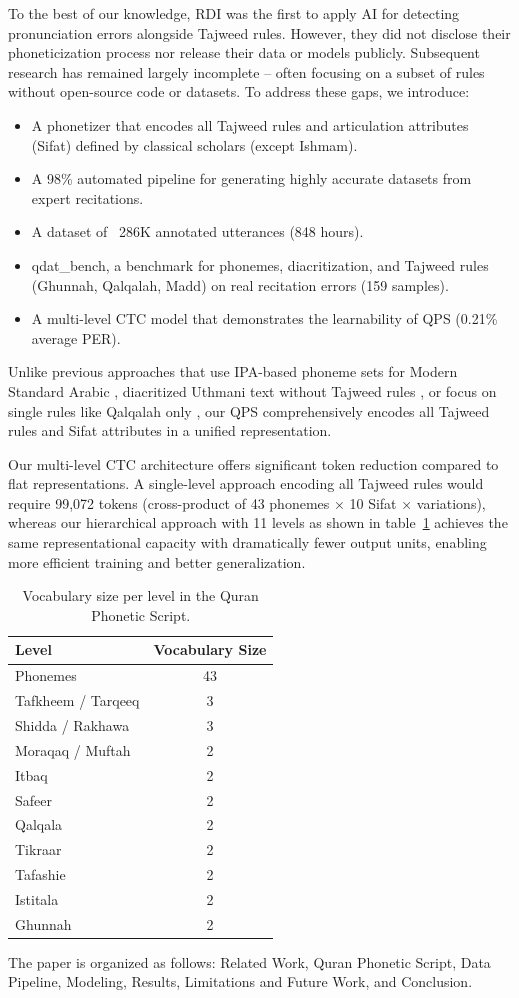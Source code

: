 To the best of our knowledge, RDI \cite{sherif2007enhancing} was the first to apply AI for detecting pronunciation errors alongside Tajweed rules. However, they did not disclose their phoneticization process nor release their data or models publicly. Subsequent research has remained largely incomplete -- often focusing on a subset of rules without open-source code or datasets. To address these gaps, we introduce:
\begin{itemize}
    \item A phonetizer that encodes all Tajweed rules and articulation attributes (Sifat) defined by classical scholars (except Ishmam).
    \item A 98\% automated pipeline for generating highly accurate datasets from expert recitations.
    \item A dataset of ~286K annotated utterances (848 hours).
    \item qdat\_bench, a benchmark for phonemes, diacritization, and Tajweed rules (Ghunnah, Qalqalah, Madd) on real recitation errors (159 samples).
    \item A multi-level CTC model that demonstrates the learnability of QPS (0.21\% average PER).
\end{itemize}


Unlike previous approaches that use IPA-based phoneme sets for Modern Standard Arabic \cite{omran2023automatic}, diacritized Uthmani text without Tajweed rules \cite{khan2021tarteel}, or focus on single rules like Qalqalah only \cite{10092350}, our QPS comprehensively encodes all Tajweed rules and Sifat attributes in a unified representation.


Our multi-level CTC architecture offers significant token reduction compared to flat representations. A single-level approach encoding all Tajweed rules would require 99,072 tokens (cross-product of 43 phonemes × 10 Sifat × variations), whereas our hierarchical approach with 11 levels as shown in table~\ref{tab:vocabulary_size} achieves the same representational capacity with dramatically fewer output units, enabling more efficient training and better generalization.

\begin{table}[t]
	\centering
	\begin{tabular}{|l|c|}
		\hline
		\textbf{Level} & \textbf{Vocabulary Size} \\
		\hline
		Phonemes & 43 \\
		Tafkheem / Tarqeeq & 3 \\
		Shidda / Rakhawa & 3 \\
		Moraqaq / Muftah & 2 \\
		Itbaq & 2 \\
		Safeer & 2 \\
		Qalqala & 2 \\
		Tikraar & 2 \\
		Tafashie & 2 \\
		Istitala & 2 \\
		Ghunnah & 2 \\
		\hline
	\end{tabular}
	\caption{Vocabulary size per level in the Quran Phonetic Script.}
	\label{tab:vocabulary_size}
\end{table}

The paper is organized as follows: Related Work, Quran Phonetic Script, Data Pipeline, Modeling, Results, Limitations and Future Work, and Conclusion.
